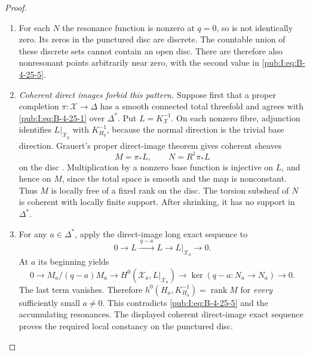 \begin{proof}
\begin{enumerate}[label=\arabic*.,leftmargin=*]
\item For each $N$ the resonance function is nonzero at
$q=0$, so is not identically zero. Its zeros in the
punctured disc are discrete. The countable union of
these discrete sets cannot contain an open disc.
There are therefore also nonresonant points arbitrarily
near zero, with the second value in \eqref{pub:I:eq:B-4-25-5}.

\item \emph{Coherent direct images forbid this pattern.}
Suppose first that a proper completion
$\pi:\mathcal X\to\Delta$ has a smooth connected
total threefold and agrees with \eqref{pub:I:eq:B-4-25-1} over
$\Delta^*$. Put $L=K_{\mathcal X}^{-1}$.
On each nonzero fibre, adjunction identifies
$L|_{\mathcal X_q}$ with $K_{H_q}^{-1}$, because
the normal direction is the trivial base direction.
Grauert's proper direct-image theorem gives coherent
sheaves
\[
 M=\pi_*L,\qquad N=R^1\pi_*L
\]
on the disc
\citep[Section 6, Hauptsatz I, p.~59]{Grauert60}.
Multiplication by a nonzero base function is injective
on $L$, and hence on $M$, since the total space is
smooth and the map is nonconstant. Thus $M$ is
locally free of a fixed rank on the disc. The torsion
subsheaf of $N$ is coherent with locally finite
support. After shrinking, it has no support in
$\Delta^*$.

\item For any $a\in\Delta^*$, apply the direct-image long
exact sequence to
\[
 0\longrightarrow L\xrightarrow{\ q-a\ }L
 \longrightarrow L|_{\mathcal X_a}\longrightarrow0.
\]
At $a$ its beginning yields
\begin{equation}
 0\longrightarrow M_a/(q-a)M_a
 \longrightarrow H^0(\mathcal X_a,L|_{\mathcal X_a})
 \longrightarrow \ker(q-a:N_a\to N_a)
 \longrightarrow0.
\label{pub:I:eq:B-4-25-6}
\end{equation}
The last term vanishes. Therefore
$h^0(H_a,K_{H_a}^{-1})=\operatorname{rank}M$ for
\emph{every} sufficiently small $a\ne0$. This
contradicts \eqref{pub:I:eq:B-4-25-5} and the accumulating resonances.
The displayed coherent direct-image exact sequence proves the
required local constancy on the punctured disc.


\end{enumerate}
\end{proof}

